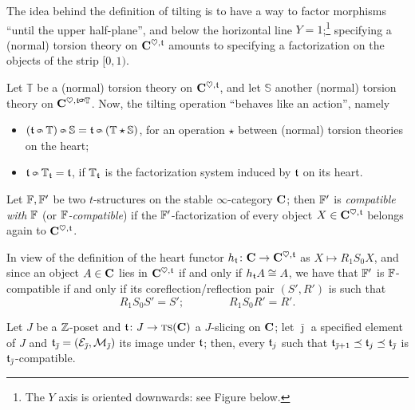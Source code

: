 \begin{remark}
The idea behind the definition of tilting is to have a way to factor morphisms ``until the upper half\hyp{}plane'', and below the horizontal line $Y=1$;\footnote{The $Y$ axis is oriented downwards: see Figure  below.} specifying a (normal) torsion theory on $\mathbf{C}^{\heartsuit, \mathfrak{t}}$ amounts to specifying a factorization on the objects of the strip $[0,1)$.
\end{remark}
\begin{proposition}
Let $\mathbb T$ be a (normal) torsion theory on $\mathbf{C}^{\heartsuit,\mathfrak{t}}$, and let $\mathbb S$ another (normal) torsion theory on $\CC^{\heart, \tee\tilt \mathbb T}$.  Now, the tilting operation ``behaves like an action'', namely
\begin{itemize}
\item $(\tee\tilt \mathbb T)\tilt \mathbb S = \tee \tilt (\mathbb T \star \mathbb S)$, for an operation $\star$ between (normal) torsion theories on the heart; 
\item $\tee \tilt \mathbb T_{\tee} = \tee$, if $\mathbb T_{\mathfrak{t}}$ is the factorization system induced by $\mathfrak{t}$ on its heart.
\end{itemize}
\end{proposition}
\begin{definition}
Let $\mathbb{F}, \mathbb{F}'$ be two $t$\hyp{}structures on the stable $\infty$\hyp{}category $\mathbf{C}$; then $\mathbb{F}'$ is \emph{compatible with $\mathbb{F}$} (or \emph{$\mathbb{F}$\hyp{}compatible}) if the $\mathbb{F}'$\hyp{}factorization of every object $X\in\mathbf{C}^{\heartsuit,\mathfrak{t}}$ belongs again to $\mathbf{C}^{\heartsuit,\mathfrak{t}}$.
\end{definition}
In view of the definition of the heart functor $h_{\mathfrak{t}}\colon \mathbf{C} \to \mathbf{C}^{\heartsuit,\mathfrak{t}}$ as $X\mapsto R_1 S_0 X$, and since an object $A\in\mathbf{C}$ lies in $\mathbf{C}^{\heartsuit,\mathfrak{t}}$ if and only if $h_{\mathfrak{t}} A \cong A$, we have that $\mathbb{F}'$ is $\mathbb{F}$\hyp{}compatible if and only if its coreflection\fshyp{}reflection pair $(S', R')$ is such that 
\[
R_1 S_0 S' = S'; \qquad\qquad R_1 S_0 R'  = R'.
\]
\begin{remark}
Let $J$ be a $\mathbb{Z}$\hyp{}poset and $\mathfrak{t}\colon J\to \text{\scshape ts}(\mathbf{C})$ a $J$\hyp{}slicing on $\mathbf{C}$; let $\bar \jmath$ a specified element of $J$ and $\mathfrak{t}_{\bar\jmath} = (\mathcal{E}_{\bar\jmath}, \mathcal{M}_{\bar\jmath})$ its image under $\mathfrak{t}$; then, every $\mathfrak{t}_j$ such that $\mathfrak{t}_{\bar\jmath+1}\preceq \mathfrak{t}_j \preceq \mathfrak{t}_{\bar\jmath}$ is $\mathfrak{t}_{\bar\jmath}$\hyp{}compatible.
\end{remark}
